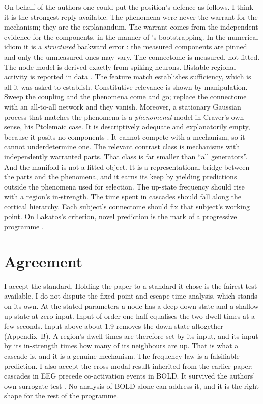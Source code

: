 \documentclass[11pt]{article}
\theoremstyle{definition}\newtheorem{observation}{Observation}
\theoremstyle{remark}\newtheorem{remark}{Remark}
\begin{document}
On behalf of the authors one could put the position's defence as follows. I think it is the strongest reply available. The phenomena were never the warrant for the mechanism; they are the explanandum. The warrant comes from the independent evidence for the components, in the manner of \textcite{glymour1980}'s bootstrapping. In the numerical idiom it is a \emph{structured} backward error \parencite{highamhigham1992}: the measured components are pinned and only the unmeasured ones may vary. The connectome is measured, not fitted. The node model is derived exactly from spiking neurons. Bistable regional activity is reported in data \parencite[refs 39--41 therein]{fousek2024}. The feature match establishes sufficiency, which is all it was asked to establish. Constitutive relevance is shown by manipulation. Sweep the coupling and the phenomena come and go; replace the connectome with an all-to-all network and they vanish. Moreover, a stationary Gaussian process that matches the phenomena is a \emph{phenomenal} model in Craver's own sense, his Ptolemaic case. It is descriptively adequate and explanatorily empty, because it posits no components \parencite{craver2006}. It cannot compete with a mechanism, so it cannot underdetermine one. The relevant contrast class is mechanisms with independently warranted parts. That class is far smaller than ``all generators''. And the manifold is not a fitted object. It is a representational bridge between the parts and the phenomena, and it earns its keep by yielding predictions outside the phenomena used for selection. The up-state frequency should rise with a region's in-strength. The time spent in cascades should fall along the cortical hierarchy. Each subject's connectome should fix that subject's working point. On Lakatos's criterion, novel prediction is the mark of a progressive programme \parencite{lakatos1970}.

\section{Agreement}
I accept the standard. Holding the paper to a standard it chose is the fairest test available. I do not dispute the fixed-point and escape-time analysis, which stands on its own. At the stated parameters a node has a deep down state and a shallow up state at zero input. Input of order one-half equalises the two dwell times at a few seconds. Input above about 1.9 removes the down state altogether (Appendix~B). A region's dwell times are therefore set by its input, and its input by its in-strength times how many of its neighbours are up. That is what a cascade is, and it is a genuine mechanism. The frequency law is a falsifiable prediction. I also accept the cross-modal result inherited from the earlier paper: cascades in EEG precede co-activation events in BOLD. It survived the authors' own surrogate test \parencite{rabuffo2021}. No analysis of BOLD alone can address it, and it is the right shape for the rest of the programme.
\end{document}
